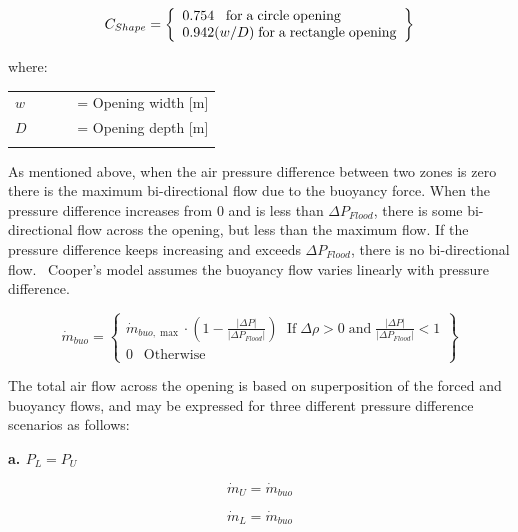 \begin{equation}
C_{Shape} = \left\{ \begin{array}{l}0.754\;\;\;{\rm{for}}\;{\rm{a}}\;{\rm{circle}}\;{\rm{opening}}\\0.942(w/D)\;{\rm{for}}\;{\rm{a}}\;{\rm{rectangle}}\;{\rm{opening}}\end{array} \right\}
\end{equation}

where:

\begin{tabular}{lp{0.7\linewidth}}
\\
$w$ &= Opening width [m]\\
$D$ &= Opening depth [m]\\
\\
\end{tabular}

As mentioned above, when the air pressure difference between two zones is zero there is the maximum bi-directional flow due to the buoyancy force. When the pressure difference increases from 0 and is less than \textbar{}$\Delta P_{Flood}$\textbar{}, there is some bi-directional flow across the opening, but less than the maximum flow. If the pressure difference keeps increasing and exceeds \textbar{}$\Delta P_{Flood}$\textbar{}, there is no bi-directional flow.~ Cooper's model assumes the buoyancy flow varies linearly with pressure difference.

\begin{equation}
\dot{m}_{buo} = \left\{ \begin{array}{l}{\dot{m}_{buo,\max }}\cdot\left( {1 - \frac{{\left| {\Delta P} \right|}}{{\left| {\Delta {P_{Flood}}} \right|}}} \right)\;\,\,\mbox{If}\;\Delta \rho  > 0\;\mbox{and}\;\frac{{\left| {\Delta P} \right|}}{{\left| {\Delta {P_{Flood}}} \right|}} < 1\\0\;\,\,\,\mbox{Otherwise}\end{array} \right\}
\end{equation}

The total air flow across the opening is based on superposition of the forced and buoyancy flows, and may be expressed for three different pressure difference scenarios as follows:

\textbf{a. $P_L = P_U$}

\begin{equation}
\dot{m}_U = \dot{m}_{buo}
\end{equation}

\begin{equation}
\dot{m}_L = \dot{m}_{buo}
\end{equation}

